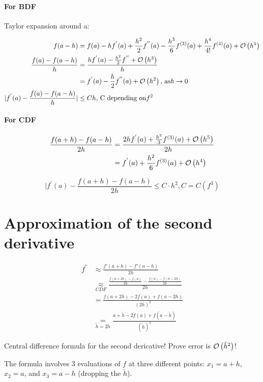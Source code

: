 \paragraph{For BDF}
Taylor expansion around a:

\begin{align*}
	f(a - h) 
	  &= f(a) - h f^{'}(a) + \frac{h^2}{2} f^{''}(a) 
	  - \frac{h^3}{6} f^{(3)}(a) + \frac{h^4}{4!}f^{(4)}(a) + \mathcal{O}\left(h^5\right) \\
	\frac{f(a) - f(a - h)}{h} 
	  &= \frac{
	  	h f^{'}(a) - \frac{h^2}{2}f^{''} + \mathcal{O}\left(h^3\right)
	  	}{h} \\
	  &= f^{'}(a) - \frac{h}{2}f^{''}(a) + \mathcal{O}\left(h^2\right) \text{, as} h \rightarrow 0 \\
	|f^{'}(a) - \frac{f(a) - f(a - h)}{h}|
		  &\leq C h \text{, C depending on} f^{2}
\end{align*}

\paragraph{For CDF}
\begin{align*}
	\frac{f(a + h) - f(a - h)}{2h} 
	  &= \frac{
	  	2h f^{'}(a) + \frac{h^3}{3} f^{(3)}(a) + \mathcal{O}\left(h^5\right)
	  	}{2h} \\
	  &= f^{'}(a) + \frac{h^2}{6}f^{(3)}(a) + \mathcal{O}\left(h^4\right)
\end{align*}

\[
	|f^{'}(a) - \frac{f(a + h) - f(a - h)}{2h} \leq C \cdot h^2, C = C(f^{3})
\]


\section{Approximation of the second derivative}

\begin{align*}
	f^{''} 
	  &\approx \frac{f'(a + h) - f'(a - h)}{2h} \\
	  &\underset{CDF}{\approx} \frac{
	    \frac{f(a + 2h) - f(a)}{2h} - 
	    \frac{f(a) - f(a - 2h)}{2h}
	    }{2h} \\
	  &= \frac{f(a + 2h) - 2f(a) + f(a - 2h)}{(2h)^2} \\
	  &\underset{\tilde{h} = 2h}{=} \frac{a + \tilde{h} - 2f(a) + f(a - \tilde{h})}
	   {(\tilde{h})^2}
\end{align*}

Central difference formula for the second dericative! 
Prove error is $\mathcal{O}\left(\tilde{h}^2\right)$!

The formula involves 3 evaluations of $f$ at three different points:
$x_1 = a + h$, $x_2 = a$, and $x_3 = a - h$ (dropping the $\tilde{h}$).

